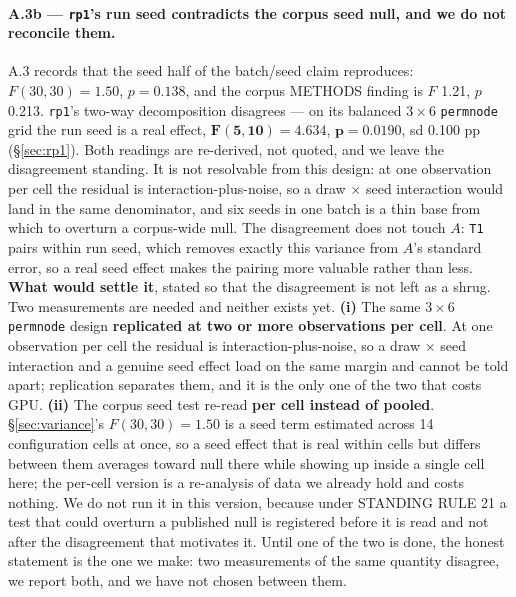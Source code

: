 \documentclass[10pt,letterpaper]{article}
\newcommand{\Astat}{A}                         %
\newcommand{\arm}[1]{\texttt{#1}}
\begin{document}
\paragraph{A.3b --- \arm{rp1}'s run seed contradicts the corpus seed null, and we do not reconcile
them.}
A.3 records that the seed half of the batch/seed claim reproduces: $F(30,30) = 1.50$, $p = 0.138$,
and the corpus METHODS finding is $F$ 1.21, $p$ 0.213. \arm{rp1}'s two-way decomposition disagrees
--- on its balanced $3 \times 6$ \arm{permnode} grid the run seed is a real effect,
$\mathbf{F(5,10) = 4.634}$, $\mathbf{p = 0.0190}$, sd 0.100 pp (\S\ref{sec:rp1}). Both readings are
re-derived, not quoted, and we leave the disagreement standing. It is not resolvable from this
design: at one observation per cell the residual is interaction-plus-noise, so a draw $\times$ seed
interaction would land in the same denominator, and six seeds in one batch is a thin base from
which to overturn a corpus-wide null. The disagreement does not touch $\Astat$: \texttt{T1} pairs
within run seed, which removes exactly this variance from $\Astat$'s standard error, so a real seed
effect makes the pairing more valuable rather than less.
\textbf{What would settle it}, stated so that the disagreement is not left as a shrug. Two
measurements are needed and neither exists yet. \textbf{(i)} The same $3 \times 6$
\arm{permnode} design \textbf{replicated at two or more observations per cell}. At one
observation per cell the residual is interaction-plus-noise, so a draw $\times$ seed interaction
and a genuine seed effect load on the same margin and cannot be told apart; replication separates
them, and it is the only one of the two that costs GPU. \textbf{(ii)} The corpus seed test re-read
\textbf{per cell instead of pooled}. \S\ref{sec:variance}'s $F(30,30) = 1.50$ is a seed term
estimated across 14 configuration cells at once, so a seed effect that is real within cells but
differs between them averages toward null there while showing up inside a single cell here; the
per-cell version is a re-analysis of data we already hold and costs nothing. We do not run it in
this version, because under STANDING RULE 21 a test that could overturn a published null is
registered before it is read and not after the disagreement that motivates it. Until one of the
two is done, the honest statement is the one we make: two measurements of the same quantity
disagree, we report both, and we have not chosen between them.
\end{document}

